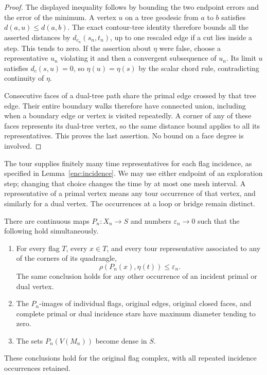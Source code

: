 \begin{proof}
The displayed inequality follows by bounding the two endpoint errors and
the error of the minimum.  A vertex $u$ on a tree geodesic from $a$ to $b$
satisfies $d(a,u)\le d(a,b)$.  The exact contour-tree identity therefore
bounds all the asserted distances by
$d_{c_n}(s_n,t_n)$, up to one rescaled edge if a cut lies inside a step.
This tends to zero.  If the assertion about $\eta$ were false, choose a
representative $u_n$ violating it and then a convergent subsequence of
$u_n$.  Its limit $u$ satisfies $d_c(s,u)=0$, so
$\eta(u)=\eta(s)$ by the scalar chord rule, contradicting continuity of
$\eta$.

Consecutive faces of a dual-tree path share the primal edge crossed by
that tree edge.  Their entire boundary walks therefore have connected
union, including when a boundary edge or vertex is visited repeatedly.
A corner of any of these faces represents its dual-tree vertex, so the
same distance bound applies to all its representatives.  This proves
the last assertion.  No bound on a face degree is involved.
\end{proof}

The tour supplies finitely many time representatives for each flag
incidence, as specified in Lemma~\ref{enc:incidence}.  We may use
either endpoint of an exploration step; changing that choice changes the
time by at most one mesh interval.  A representative of a primal vertex
means any tour occurrence of that vertex, and similarly for a dual
vertex.  The occurrences at a loop or bridge remain distinct.

\begin{proposition}
\label{top:projection}
There are continuous maps $P_n:X_n\to S$ and numbers
$\varepsilon_n\to0$ such that the following hold simultaneously.
\begin{enumerate}[label=(\roman*)]
\item For every flag $T$, every $x\in T$, and every tour representative
associated to any of the corners of its quadrangle,
\[
 \rho(P_n(x),\eta(t))\le\varepsilon_n.
\]
The same conclusion holds for any other occurrence of an incident primal
or dual vertex.
\item The $P_n$-images of individual flags, original edges, original
closed faces, and complete primal or dual incidence stars have maximum
diameter tending to zero.
\item The sets $P_n(V(M_n))$ become dense in $S$.
\end{enumerate}
These conclusions hold for the original flag complex, with all repeated
incidence occurrences retained.
\end{proposition}


